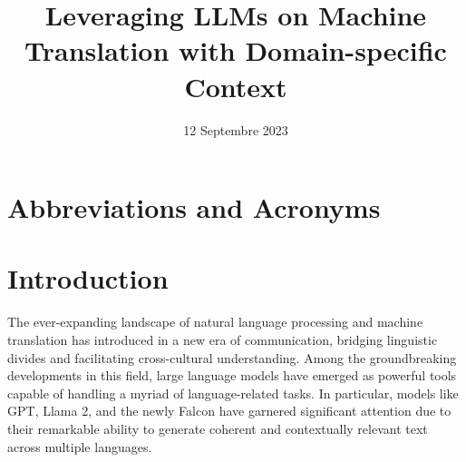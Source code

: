 \documentclass[12pt]{article}
\title{Leveraging LLMs on Machine Translation with Domain-specific Context}
\author{
\AND
\AND
\AND
\AND\AND
\AND
\AND
}
\date{12 Septembre 2023}
\begin{document}
\maketitle

\newpage
\tableofcontents
\thispagestyle{empty}


\newpage
\thispagestyle{empty}

\listoffigures 

\newpage
\listoftables

\newpage
\thispagestyle{empty}

\section*{Abbreviations and Acronyms}
\begin{acronym}[XXXXXXXXXXXXXX]
\end{acronym}






\newpage
\setcounter{page}{1}
\section{Introduction}

The ever-expanding landscape of natural language processing and machine translation has introduced in a new era of communication, bridging linguistic divides and facilitating cross-cultural understanding. Among the groundbreaking developments in this field, large language models have emerged as powerful tools capable of handling a myriad of language-related tasks. In particular, models like GPT, Llama 2, and the newly Falcon have garnered significant attention due to their remarkable ability to generate coherent and contextually relevant text across multiple languages.
\end{document}
